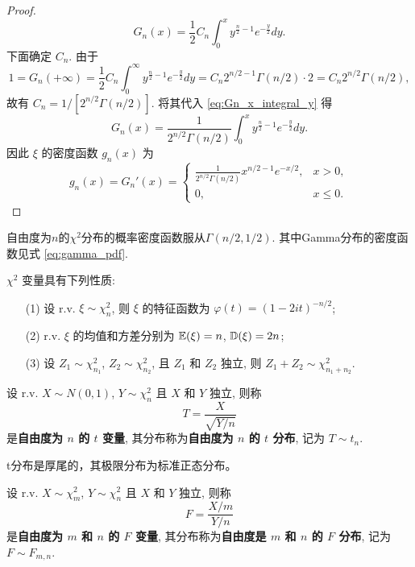 \begin{proof}
\begin{equation} \label{eq:Gn_x_integral_y}
G_n(x) = \frac{1}{2}C_n \int_0^x y^{\frac{n}{2}-1}e^{-\frac{y}{2}}dy.
\end{equation}
下面确定 $C_n$. 由于
\[
1 = G_n(+\infty) = \frac{1}{2}C_n \int_0^\infty y^{\frac{n}{2}-1}e^{-\frac{y}{2}}dy = C_n 2^{n/2-1} \Gamma(n/2) \cdot 2 = C_n 2^{n/2} \Gamma(n/2),
\]
故有 $C_n = 1/[2^{n/2}\Gamma(n/2)]$. 将其代入 \eqref{eq:Gn_x_integral_y} 得
\[
G_n(x) = \frac{1}{2^{n/2}\Gamma(n/2)} \int_0^x y^{\frac{n}{2}-1}e^{-\frac{y}{2}}dy.
\]
因此 $\xi$ 的密度函数 $g_n(x)$ 为
\[
g_n(x) = G_n'(x) =
\begin{cases}
\frac{1}{2^{n/2}\Gamma(n/2)}x^{n/2-1}e^{-x/2}, & x > 0, \\
0, & x \le 0.
\end{cases}
\]
\end{proof}
\begin{remark}
    自由度为$n$的$\chi^2$分布的概率密度函数服从$\Gamma(n/2,1/2)$. 其中Gamma分布的密度函数见式 \eqref{eq:gamma_pdf}.
\end{remark}
\begin{proposition} \label{prop:chi_squared_properties}
$\chi^2$ 变量具有下列性质:
\begin{enumerate}
    \item[(1)] 设 r.v. $\xi \sim \chi_n^2$, 则 $\xi$ 的特征函数为 $\varphi(t)=(1-2it)^{-n/2}$;
    \item[(2)] r.v. $\xi$ 的均值和方差分别为 $\mathbb{E}(\xi)=n$, $\mathbb{D}(\xi)=2n$;
    \item[(3)] 设 $Z_1 \sim \chi_{n_1}^2$, $Z_2 \sim \chi_{n_2}^2$, 且 $Z_1$ 和 $Z_2$ 独立, 则 $Z_1+Z_2 \sim \chi_{n_1+n_2}^2$.
\end{enumerate}
\end{proposition}

\begin{definition}[t分布] \label{def:t_distribution}
设 r.v. $X \sim N(0,1)$, $Y \sim \chi_n^2$ 且 $X$ 和 $Y$ 独立, 则称
\[
T = \frac{X}{\sqrt{Y/n}}
\]
是\textbf{自由度为 $n$ 的 $t$ 变量}, 其分布称为\textbf{自由度为 $n$ 的 $t$ 分布}, 记为 $T \sim t_n$.
\end{definition}
\begin{remark}
    t分布是厚尾的，其极限分布为标准正态分布。
\end{remark}

\begin{definition}[F分布] \label{def:f_distribution}
设 r.v. $X \sim \chi_m^2$, $Y \sim \chi_n^2$ 且 $X$ 和 $Y$ 独立, 则称
\[
F = \frac{X/m}{Y/n}
\]
是\textbf{自由度为 $m$ 和 $n$ 的 $F$ 变量}, 其分布称为\textbf{自由度是 $m$ 和 $n$ 的 $F$ 分布}, 记为 $F \sim F_{m,n}$.
\end{definition}

